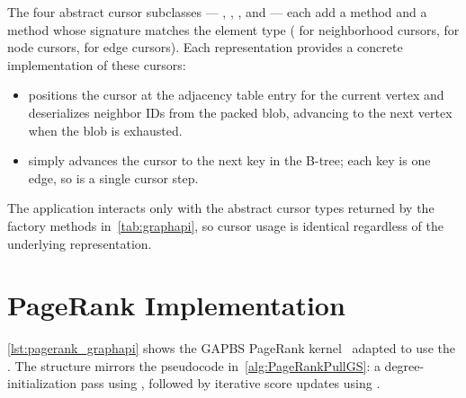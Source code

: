 The four abstract cursor subclasses --- , , , and  --- each add a  method and a  method whose signature matches the element type ( for neighborhood cursors,  for node cursors,  for edge cursors).
Each representation provides a concrete implementation of these cursors:
\begin{itemize}
  \item {} positions the \wt{} cursor at the adjacency table entry for the current vertex and deserializes neighbor IDs from the packed blob, advancing to the next vertex when the blob is exhausted.
  \item {} simply advances the \wt{} cursor to the next key in the B-tree; each key is one edge, so  is a single cursor step.
\end{itemize}
The application interacts only with the abstract cursor types returned by the factory methods in~\autoref{tab:graphapi}, so cursor usage is identical regardless of the underlying representation.

\section{PageRank Implementation}
\label{appendix:pagerank_graphapi}

\autoref{lst:pagerank_graphapi} shows the GAPBS PageRank kernel~\cite{beamer2015gap} adapted to use the \api{}.
The structure mirrors the pseudocode in~\autoref{alg:PageRankPullGS}: a degree-initialization pass using , followed by iterative score updates using .

